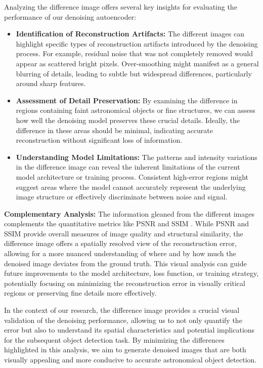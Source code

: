 \documentclass[12pt, conference]{IEEEtran}
\begin{document}
Analyzing the difference image offers several key insights for evaluating the performance of our denoising autoencoder:
\begin{itemize}
    \item \textbf{Identification of Reconstruction Artifacts:} The different images can highlight specific types of reconstruction artifacts introduced by the denoising process. For example, residual noise that was not completely removed would appear as scattered bright pixels. Over-smoothing might manifest as a general blurring of details, leading to subtle but widespread differences, particularly around sharp features.
    \item \textbf{Assessment of Detail Preservation:} By examining the difference in regions containing faint astronomical objects or fine structures, we can assess how well the denoising model preserves these crucial details. Ideally, the difference in these areas should be minimal, indicating accurate reconstruction without significant loss of information.
    \item \textbf{Understanding Model Limitations:} The patterns and intensity variations in the difference image can reveal the inherent limitations of the current model architecture or training process. Consistent high-error regions might suggest areas where the model cannot accurately represent the underlying image structure or effectively discriminate between noise and signal.
\end{itemize}
\textbf{Complementary Analysis:}
The information gleaned from the different images complements the quantitative metrics like PSNR \cite{hore2010image} and SSIM \cite{wang2004image}. While PSNR \cite{hore2010image} and SSIM \cite{wang2004image} provide overall measures of image quality and structural similarity, the difference image offers a spatially resolved view of the reconstruction error, allowing for a more nuanced understanding of where and by how much the denoised image deviates from the ground truth. This visual analysis can guide future improvements to the model architecture, loss function, or training strategy, potentially focusing on minimizing the reconstruction error in visually critical regions or preserving fine details more effectively.

In the context of our research, the difference image provides a crucial visual validation of the denoising performance, allowing us to not only quantify the error but also to understand its spatial characteristics and potential implications for the subsequent object detection task. By minimizing the differences highlighted in this analysis, we aim to generate denoised images that are both visually appealing and more conducive to accurate astronomical object detection.
\end{document}
